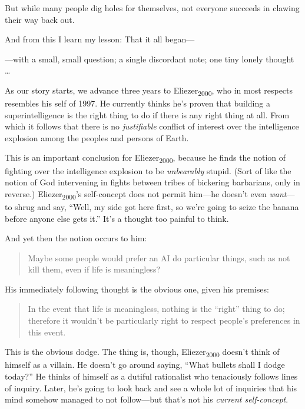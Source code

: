 {
 But while many people dig holes for themselves, not everyone
succeeds in clawing their way back out.}

{
 And from this I learn my lesson: That it all began---}

{
 {}---with a small, small question; a single discordant note; one
tiny lonely thought \ldots}

{
 As our story starts, we advance three years to
Eliezer\textsubscript{2000}, who in most respects resembles his self of
1997. He currently thinks he's proven that building a
superintelligence is the right thing to do if there is any right thing
at all. From which it follows that there is no \textit{justifiable}
conflict of interest over the intelligence explosion among the peoples
and persons of Earth.}

{
 This is an important conclusion for Eliezer\textsubscript{2000},
because he finds the notion of fighting over the intelligence explosion
to be \textit{unbearably} stupid. (Sort of like the notion of God
intervening in fights between tribes of bickering barbarians, only in
reverse.) Eliezer\textsubscript{2000}'s self-concept
does not permit him---he doesn't even
\textit{want}{}---to shrug and say, ``Well, my side
got here first, so we're going to seize the banana
before anyone else gets it.'' It's a
thought too painful to think.}

{
 And yet then the notion occurs to him:}

\begin{quote}
{
 Maybe some people would prefer an AI do particular things, such as
 not kill them, even if life is meaningless?}
\end{quote}

{
 His immediately following thought is the obvious one, given his
premises:}

\begin{quote}
{
 In the event that life is meaningless, nothing is the
``right'' thing to do; therefore it
wouldn't be particularly right to respect
people's preferences in this event.}
\end{quote}

{
 This is the obvious dodge. The thing is, though,
Eliezer\textsubscript{2000} doesn't think of himself as
a villain. He doesn't go around saying,
``What bullets shall I dodge
today?'' He thinks of himself as a dutiful
rationalist who tenaciously follows lines of inquiry. Later,
he's going to look back and see a whole lot of
inquiries that his mind somehow managed to not follow---but
that's not his \textit{current self-concept}.}

